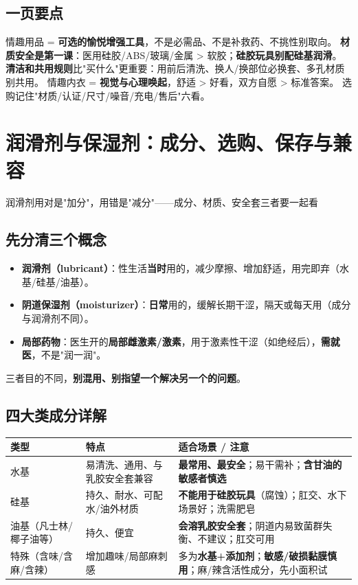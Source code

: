 \documentclass[12pt,UTF8,openany]{ctexbook}
\begin{document}
\section{一页要点}
情趣用品 = \textbf{可选的愉悦增强工具}，不是必需品、不是补救药、不挑性别取向。
\textbf{材质安全是第一课}：医用硅胶/ABS/玻璃/金属 > 软胶；\textbf{硅胶玩具别配硅基润滑}。
\textbf{清洁和共用规则}比"买什么"更重要：用前后清洗、换人/换部位必换套、多孔材质别共用。
情趣内衣 = \textbf{视觉与心理唤起}，舒适 > 好看，双方自愿 > 标准答案。
选购记住"材质/认证/尺寸/噪音/充电/售后"六看。


\chapter{润滑剂与保湿剂：成分、选购、保存与兼容}

\begin{center}
\myhei\large 润滑剂用对是"加分"，用错是"减分"——成分、材质、安全套三者要一起看
\end{center}

\section{先分清三个概念}
\begin{itemize}[leftmargin=2em,itemsep=0.3em]
  \item \textbf{润滑剂（lubricant）}：性生活\textbf{当时}用的，减少摩擦、增加舒适，用完即弃（水基/硅基/油基）。
  \item \textbf{阴道保湿剂（moisturizer）}：\textbf{日常}用的，缓解长期干涩，隔天或每天用（成分与润滑剂不同）。
  \item \textbf{局部药物}：医生开的\textbf{局部雌激素/激素}，用于激素性干涩（如绝经后），\textbf{需就医}，不是"润一润"。
\end{itemize}
三者目的不同，\textbf{别混用、别指望一个解决另一个的问题}。

\section{四大类成分详解}
\begin{tabularx}{\textwidth}{X X X}
\toprule
\textbf{类型} & \textbf{特点} & \textbf{适合场景 / 注意} \\
\midrule
水基 & 易清洗、通用、与乳胶安全套兼容 & \textbf{最常用、最安全}；易干需补；\textbf{含甘油的敏感者慎选} \\
硅基 & 持久、耐水、可配水/油外材质 & \textbf{不能用于硅胶玩具}（腐蚀）；肛交、水下场景好；洗需肥皂 \\
油基（凡士林/椰子油等） & 持久、便宜 & \textbf{会溶乳胶安全套}；阴道内易致菌群失衡、不建议；肛交可用 \\
特殊（含味/含麻/含辣） & 增加趣味/局部麻刺感 & 多为\textbf{水基+添加剂}；\textbf{敏感/破损黏膜慎用}；麻/辣含活性成分，先小面积试 \\
\bottomrule
\end{tabularx}
\end{document}
